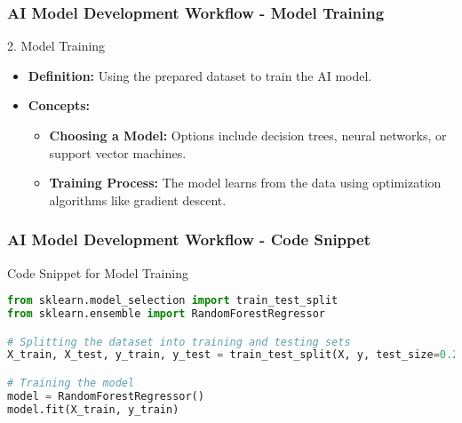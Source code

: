 \documentclass{beamer}
\begin{document}
\begin{frame}[fragile]

\frametitle{AI Model Development Workflow - Model Training}

\begin{block}{2. Model Training}
    \begin{itemize}
        \item \textbf{Definition:} Using the prepared dataset to train the AI model.
        
        \item \textbf{Concepts:}
        \begin{itemize}
            \item \textbf{Choosing a Model:} Options include decision trees, neural networks, or support vector machines.
            \item \textbf{Training Process:} The model learns from the data using optimization algorithms like gradient descent.
        \end{itemize}
    \end{itemize}
\end{block}

\end{frame}

\begin{frame}[fragile]

\frametitle{AI Model Development Workflow - Code Snippet}

\begin{block}{Code Snippet for Model Training}
\begin{lstlisting}[language=Python]
from sklearn.model_selection import train_test_split
from sklearn.ensemble import RandomForestRegressor

# Splitting the dataset into training and testing sets
X_train, X_test, y_train, y_test = train_test_split(X, y, test_size=0.2, random_state=42)

# Training the model
model = RandomForestRegressor()
model.fit(X_train, y_train)
\end{lstlisting}
\end{block}

\end{frame}
\end{document}

